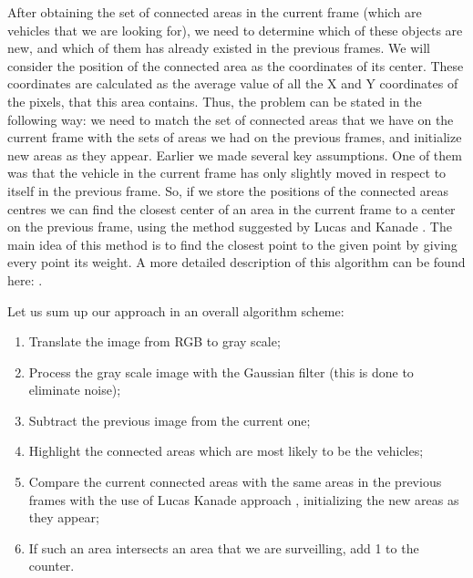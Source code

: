 \documentclass[12pt,a4paper,oneside,titlepage]{article}
\begin{document}
After obtaining the set of connected areas in the current frame (which are vehicles that we are looking for), we need to determine which of these objects are new, and which of them has already existed in the previous frames.
We will consider the position of the connected area as the coordinates of its center.
These coordinates are calculated as the average value of all the X and Y coordinates of the pixels, that this area contains.
Thus, the problem can be stated in the following way: we need to match the set of connected areas that we have on the current frame with the sets of areas we had on the previous frames, and initialize new areas as they appear.
Earlier we made several key assumptions.
One of them was that the vehicle in the current frame has only slightly moved in respect to itself in the previous frame.
So, if we store the positions of the connected areas centres we can find the closest center of an area in the current frame to a center on the previous frame, using the method suggested by Lucas and Kanade \cite{lucaskanade}.
The main idea of this method is to find the closest point to the given point by giving every point its weight.
A more detailed description of this algorithm can be found here: \cite{lucaskanade}.


Let us sum up our approach in an overall algorithm scheme:
\begin{enumerate}
	\item Translate the image from RGB to gray scale;
	\item Process the gray scale image with the Gaussian filter (this is done to eliminate noise);
	\item Subtract the previous image from the current one;
	\item Highlight the connected areas which are most likely to be the vehicles;
	\item Compare the current connected areas with the same areas in the previous frames with the use of Lucas Kanade approach \cite{lucaskanade}, initializing the new areas as they appear;
	\item If such an area intersects an area that we are surveilling, add 1 to the counter.
\end{enumerate}













\newpage
\end{document}

